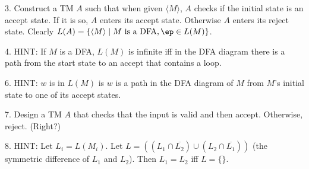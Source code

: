 3. Construct a TM $A$ such that
when given $\langle M \rangle$, $A$ checks if the initial state is an accept
state. If it is so, $A$ enters its accept state.
Otherwise $A$ enters its reject state.
Clearly $L(A) = \{ \langle M \rangle \mid M \text{ is a DFA},
\ep \in L(M)\}$.

4. HINT:
If $M$ is a DFA, $L(M)$ is infinite iff in the DFA diagram
there is a path from the start state to an accept that contains a loop.


6. HINT: $w$ is in $L(M)$ is $w$ is a path in the DFA diagram of $M$
from $M$'s initial state to one of its accept states.

7. Design a TM $A$ that checks that the input is valid and then
accept. Otherwise, reject. (Right?)

8. HINT: Let $L_i = L(M_i)$.
Let $L = ((L_1 \cap \overline{L_2}) \cup (L_2 \cap \overline{L_1}))$
(the symmetric difference of $L_1$ and $L_2$).
Then $L_1 = L_2$ iff $L = \{\}$.

